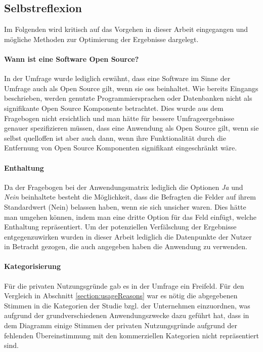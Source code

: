 \documentclass[a4paper]{article}
\begin{document}
        \subsection{Selbstreflexion}\label{section:selbstreflexion}
            Im Folgenden wird kritisch auf das Vorgehen in dieser Arbeit eingegangen und mögliche Methoden zur Optimierung der Ergebnisse dargelegt.
            \paragraph{Wann ist eine Software Open Source?}
                In der Umfrage wurde lediglich erwähnt, dass eine Software im Sinne der Umfrage auch als Open Source gilt, wenn sie \gls{oss} beinhaltet. Wie bereits Eingangs beschrieben, werden genutzte Programmiersprachen oder Datenbanken nicht als signifikante Open Source Komponente betrachtet. Dies wurde aus dem Fragebogen nicht ersichtlich und man hätte für bessere Umfrageergebnisse genauer spezifizieren müssen, dass eine Anwendung als Open Source gilt, wenn sie selbst quelloffen ist aber auch dann, wenn ihre Funktionalität durch die Entfernung von Open Source Komponenten signifikant eingeschränkt wäre.
                
            \paragraph{Enthaltung}
                Da der Fragebogen bei der Anwendungsmatrix lediglich die Optionen \emph{Ja} und \emph{Nein} beinhaltete besteht die Möglichkeit, dass die Befragten die Felder auf ihrem Standardwert ({\scriptsize Nein}) belassen haben, wenn sie sich unsicher waren. Dies hätte man umgehen können, indem man eine dritte Option für das Feld einfügt, welche Enthaltung repräsentiert. Um der potenziellen Verfälschung der Ergebnisse entgegenzuwirken wurden in dieser Arbeit lediglich die Datenpunkte der Nutzer in Betracht gezogen, die auch angegeben haben die Anwendung zu verwenden.
                
            \paragraph{Kategorisierung}
                Für die privaten Nutzungsgründe gab es in der Umfrage ein Freifeld. Für den Vergleich in Abschnitt \ref{section:usageReasons} war es nötig die abgegebenen Stimmen in die Kategorien der Studie bzgl. der Unternehmen einzuordnen, was aufgrund der grundverschiedenen Anwendungszwecke dazu geführt hat, dass in dem Diagramm einige Stimmen der privaten Nutzungsgründe aufgrund der fehlenden Übereinstimmung mit den kommerziellen Kategorien nicht repräsentiert sind.
                
\end{document}
